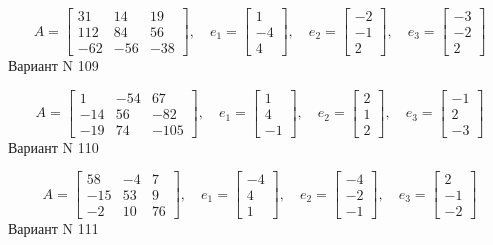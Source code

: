 \documentclass[11pt]{report}
\begin{document}
$$A = \left[\begin{matrix}31 & 14 & 19\\112 & 84 & 56\\-62 & -56 & -38\end{matrix}\right],\quad e_1 = \left[\begin{matrix}1\\-4\\4\end{matrix}\right],\quad e_2 = \left[\begin{matrix}-2\\-1\\2\end{matrix}\right],\quad e_3 = \left[\begin{matrix}-3\\-2\\2\end{matrix}\right]$$Вариант N 109

$$A = \left[\begin{matrix}1 & -54 & 67\\-14 & 56 & -82\\-19 & 74 & -105\end{matrix}\right],\quad e_1 = \left[\begin{matrix}1\\4\\-1\end{matrix}\right],\quad e_2 = \left[\begin{matrix}2\\1\\2\end{matrix}\right],\quad e_3 = \left[\begin{matrix}-1\\2\\-3\end{matrix}\right]$$Вариант N 110

$$A = \left[\begin{matrix}58 & -4 & 7\\-15 & 53 & 9\\-2 & 10 & 76\end{matrix}\right],\quad e_1 = \left[\begin{matrix}-4\\4\\1\end{matrix}\right],\quad e_2 = \left[\begin{matrix}-4\\-2\\-1\end{matrix}\right],\quad e_3 = \left[\begin{matrix}2\\-1\\-2\end{matrix}\right]$$Вариант N 111
\end{document}
